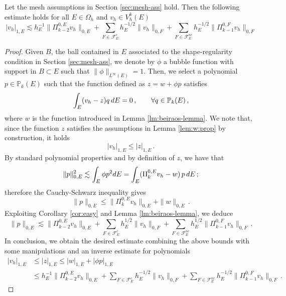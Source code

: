 \documentclass[10pt,a4paper]{amsart}
\newcommand{\PiZeroE}{\Pi^{0,E}_k}
\begin{document}
\begin{proposition}\label{prop:judoboy}
Let the mesh assumptions in Section \ref{sec:mesh-ass} hold.
Then  the following estimate holds for all $E \in \Omega_h$ and $v_h \in V_h^k(E)$
\[
|v_h|_{1,E} 
\lesssim h_E^{-1} \| \Pi^{0,E}_{k-2} v_h \|_{0,E}
+ \sum_{F \in \mathcal{F}^{c}_E} h_E^{-1/2} \| v_h \|_{0,F}
+ \sum_{F \in \mathcal{F}^{nc}_E} h_E^{-1/2} \| \Pi^{0,F}_{k-1} v_h \|_{0,F}
\]
\end{proposition}

\begin{proof}
Given $B$, the ball contained in $E$ associated to the shape-regularity condition in Section \ref{sec:mesh-ass},
we denote by $\phi$ a bubble function with support in $B \subset E$ such that $\| \phi \|_{L^\infty(E)} = 1$.
Then, we select a polynomial $p \in \mathbb{P}_k(E)$ such that the function defined as $z = w + \phi p$ satisfies
\[
\int_E (v_h - z) q \, {\rm d }E = 0 \, , \qquad \forall q \in \mathbb{P}_k(E) \, ,
\]
where $w$ is the function introduced in Lemma \ref{lm:beiraos-lemma}.
We note that, since the function $z$ satisfies the assumptions in Lemma \ref{lem:w:prop} by construction, it holds
\[
|v_h|_{1,E} \leq | z |_{1,E} \, .
\]
By standard polynomial properties and by definition of $z$, we have that
\[
\| p \|^2_{0,E}
\lesssim
\int_E \phi p^2 {\rm d}E
=
\int_E (\PiZeroE v_h - w) \, p \,  {\rm d}E \, ;
\]
therefore the Cauchy-Schwarz inequality gives
\[
\| p \|_{0,E} 
\leq 
\| \PiZeroE v_h\|_{0,E} + \| w \|_{0,E} \, .
\]
Exploiting Corollary \ref{cor:easy} and Lemma \ref{lm:beiraos-lemma}, we deduce
\[
\| p \|_{0,E} 
\lesssim
 \| \Pi^{0,E}_{k-2} v_h \|_{0,E}
+ \sum_{F \in \mathcal{F}^{c}_E} h_E^{1/2} \| v_h \|_{0,F}
+ \sum_{F \in \mathcal{F}^{nc}_E} h_E^{1/2} \| \Pi^{0,F}_{k-1} v_h \|_{0,F} \, .
\]
In conclusion, we obtain the desired estimate 
combining the above bounds with some manipulations and an inverse estimate for polynomials
\[
\begin{aligned}
|v_h|_{1,E} &\leq | z |_{1,E}
\leq | w |_{1,E} + | \phi p|_{1,E} \\
&\leq h_E^{-1} \| \Pi^{0,E}_{k-2} v_h \|_{0,E}
+ \sum_{F \in \mathcal{F}^{c}_E} h_E^{-1/2} \| v_h \|_{0,F}
+ \sum_{F \in \mathcal{F}^{nc}_E} h_E^{-1/2} \| \Pi^{0,F}_{k-1} v_h \|_{0,F} \, .
\end{aligned}
\]
 \end{proof}
\end{document}
